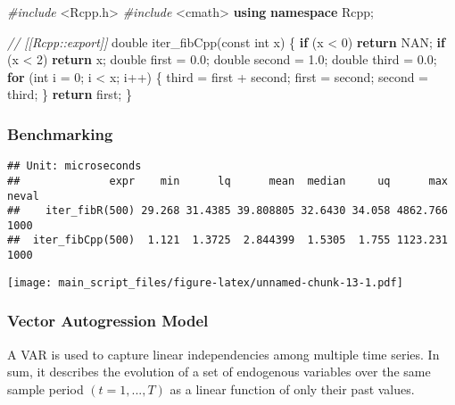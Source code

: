 \documentclass[]{article}
\newenvironment{Shaded}{\begin{snugshade}}{\end{snugshade}}
\newcommand{\KeywordTok}[1]{\textcolor[rgb]{0.13,0.29,0.53}{\textbf{#1}}}
\newcommand{\DataTypeTok}[1]{\textcolor[rgb]{0.13,0.29,0.53}{#1}}
\newcommand{\DecValTok}[1]{\textcolor[rgb]{0.00,0.00,0.81}{#1}}
\newcommand{\FloatTok}[1]{\textcolor[rgb]{0.00,0.00,0.81}{#1}}
\newcommand{\ImportTok}[1]{#1}
\newcommand{\CommentTok}[1]{\textcolor[rgb]{0.56,0.35,0.01}{\textit{#1}}}
\newcommand{\ControlFlowTok}[1]{\textcolor[rgb]{0.13,0.29,0.53}{\textbf{#1}}}
\newcommand{\PreprocessorTok}[1]{\textcolor[rgb]{0.56,0.35,0.01}{\textit{#1}}}
\newcommand{\AttributeTok}[1]{\textcolor[rgb]{0.77,0.63,0.00}{#1}}
\newcommand{\NormalTok}[1]{#1}
\begin{document}
\begin{Shaded}
\begin{Highlighting}[]
\PreprocessorTok{#include }\ImportTok{<Rcpp.h>}
\PreprocessorTok{#include }\ImportTok{<cmath>}
\KeywordTok{using} \KeywordTok{namespace}\NormalTok{ Rcpp;}

\CommentTok{// [[Rcpp::export]]}
\DataTypeTok{double}\NormalTok{ iter_fibCpp(}\AttributeTok{const} \DataTypeTok{int}\NormalTok{ x) \{}
  \ControlFlowTok{if}\NormalTok{ (x < }\DecValTok{0}\NormalTok{) }\ControlFlowTok{return}\NormalTok{ NAN;}
  \ControlFlowTok{if}\NormalTok{ (x < }\DecValTok{2}\NormalTok{) }\ControlFlowTok{return}\NormalTok{ x;}
  \DataTypeTok{double}\NormalTok{ first = }\FloatTok{0.0}\NormalTok{;}
  \DataTypeTok{double}\NormalTok{ second = }\FloatTok{1.0}\NormalTok{;}
  \DataTypeTok{double}\NormalTok{ third = }\FloatTok{0.0}\NormalTok{;}
  \ControlFlowTok{for}\NormalTok{ (}\DataTypeTok{int}\NormalTok{ i = }\DecValTok{0}\NormalTok{; i < x; i++) \{}
\NormalTok{    third = first + second;}
\NormalTok{    first = second;}
\NormalTok{    second = third;}
\NormalTok{  \}}
  \ControlFlowTok{return}\NormalTok{ first;}
\NormalTok{\}}
\end{Highlighting}
\end{Shaded}

\newpage

\subsubsection{Benchmarking}\label{benchmarking-2}

\begin{verbatim}
## Unit: microseconds
##              expr    min      lq      mean  median     uq      max neval
##    iter_fibR(500) 29.268 31.4385 39.808805 32.6430 34.058 4862.766  1000
##  iter_fibCpp(500)  1.121  1.3725  2.844399  1.5305  1.755 1123.231  1000
\end{verbatim}

\texttt{[image: main\_script\_files/figure-latex/unnamed-chunk-13-1.pdf]}

\newpage

\subsubsection{Vector Autogression
Model}\label{vector-autogression-model}

A VAR is used to capture linear independencies among multiple time
series. In sum, it describes the evolution of a set of endogenous
variables over the same sample period \((t = 1, ..., T)\) as a linear
function of only their past values.
\end{document}
